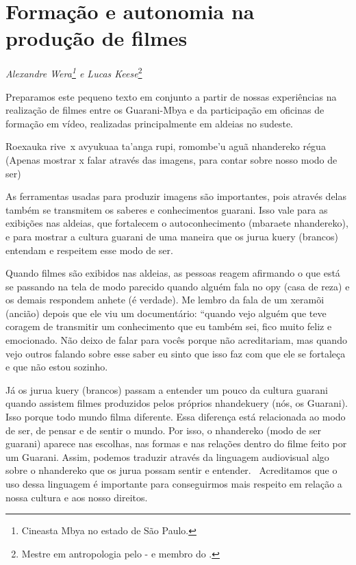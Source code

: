 \chapter{Formação e autonomia na produção de filmes}
\begin{flushright}
\emph{Alexandre Wera\footnote{Cineasta Mbya no estado de São Paulo.} e Lucas
Keese}\footnote{Mestre em antropologia pelo - e membro do
.}
\end{flushright}
\medskip

Preparamos este pequeno texto em conjunto a partir de nossas
experiências na realização de filmes entre os Guarani-Mbya e da
participação em oficinas de formação em vídeo, realizadas
principalmente em aldeias no sudeste.

Roexauka rive~x avyukuaa ta’anga rupi, romombe’u aguã nhandereko régua
(Apenas mostrar x falar através das imagens, para contar sobre nosso
modo de ser)%


As ferramentas usadas para produzir imagens são importantes, pois
através delas também se transmitem os saberes e conhecimentos guarani.
Isso vale para as exibições nas aldeias, que fortalecem o
autoconhecimento (mbaraete nhandereko), e para mostrar a cultura
guarani de uma maneira que os jurua kuery (brancos) entendam e
respeitem esse modo de ser.

Quando filmes são exibidos nas aldeias, as pessoas reagem afirmando o
que está se passando na tela de modo parecido quando alguém fala no opy
(casa de reza) e os demais respondem anhete (é verdade). Me lembro da
fala de um xeramõi (ancião) depois que ele viu um documentário: ``quando
vejo alguém que teve coragem de transmitir um conhecimento que eu
também sei, fico muito feliz e emocionado. Não deixo de falar para
vocês porque não acreditariam, mas quando vejo outros falando sobre
esse saber eu sinto que isso faz com que ele se fortaleça e que não
estou sozinho.

Já os jurua kuery (brancos) passam a entender um pouco da cultura
guarani quando assistem filmes produzidos pelos próprios nhandekuery
(nós, os Guarani). Isso porque todo mundo filma diferente. Essa
diferença está relacionada ao modo de ser, de pensar e de sentir o
mundo. Por isso, o nhandereko (modo de ser guarani) aparece nas
escolhas, nas formas e nas relações dentro do filme feito por um
Guarani. Assim, podemos traduzir através da linguagem audiovisual algo
sobre o nhandereko que os jurua possam sentir e entender.~ Acreditamos
que o uso dessa linguagem é importante para conseguirmos mais respeito
em relação a nossa cultura e aos nosso direitos.

